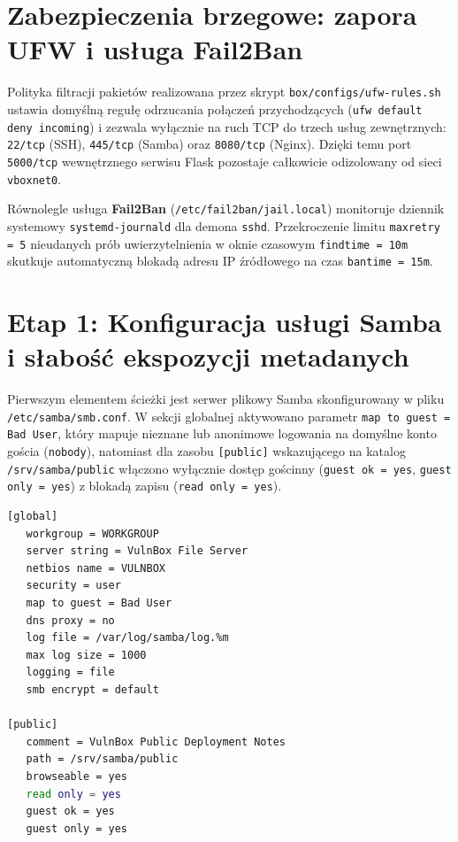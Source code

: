 \section{Zabezpieczenia brzegowe: zapora UFW i usługa Fail2Ban}
\label{sec:ufw-fail2ban}

Polityka filtracji pakietów realizowana przez skrypt \texttt{box/configs/ufw-rules.sh} ustawia domyślną regułę odrzucania połączeń przychodzących (\texttt{ufw default deny incoming}) i zezwala wyłącznie na ruch TCP do trzech usług zewnętrznych: \texttt{22/tcp} (SSH), \texttt{445/tcp} (Samba) oraz \texttt{8080/tcp} (Nginx). Dzięki temu port \texttt{5000/tcp} wewnętrznego serwisu Flask pozostaje całkowicie odizolowany od sieci \texttt{vboxnet0}.

Równolegle usługa \textbf{Fail2Ban} (\texttt{/etc/fail2ban/jail.local}) monitoruje dziennik systemowy \texttt{systemd-journald} dla demona \texttt{sshd}. Przekroczenie limitu \texttt{maxretry = 5} nieudanych prób uwierzytelnienia w oknie czasowym \texttt{findtime = 10m} skutkuje automatyczną blokadą adresu IP źródłowego na czas \texttt{bantime = 15m}.

\section{Etap 1: Konfiguracja usługi Samba i słabość ekspozycji metadanych}
\label{sec:konfiguracja-samba}

Pierwszym elementem ścieżki jest serwer plikowy Samba skonfigurowany w pliku \texttt{/etc/samba/smb.conf}. W sekcji globalnej aktywowano parametr \texttt{map to guest = Bad User}, który mapuje nieznane lub anonimowe logowania na domyślne konto gościa (\texttt{nobody}), natomiast dla zasobu \texttt{[public]} wskazującego na katalog \texttt{/srv/samba/public} włączono wyłącznie dostęp gościnny (\texttt{guest ok = yes}, \texttt{guest only = yes}) z blokadą zapisu (\texttt{read only = yes}).

\begin{lstlisting}[language=bash, caption={Definicja anonimowego udziału public w pliku /etc/samba/smb.conf}, label={lst:smb-conf}]
[global]
   workgroup = WORKGROUP
   server string = VulnBox File Server
   netbios name = VULNBOX
   security = user
   map to guest = Bad User
   dns proxy = no
   log file = /var/log/samba/log.%m
   max log size = 1000
   logging = file
   smb encrypt = default

[public]
   comment = VulnBox Public Deployment Notes
   path = /srv/samba/public
   browseable = yes
   read only = yes
   guest ok = yes
   guest only = yes
\end{lstlisting}

